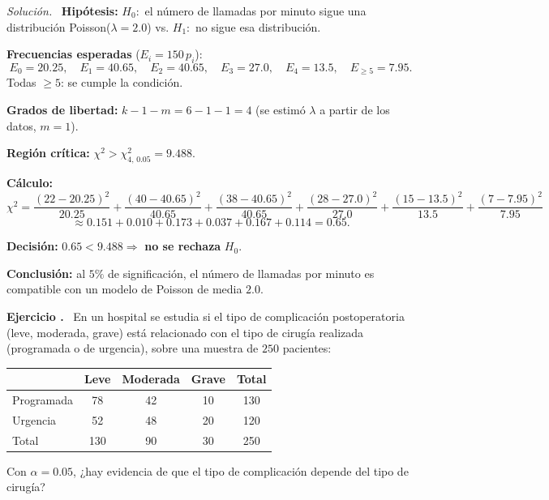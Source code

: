 \documentclass[11pt,a4paper]{article}
\newcounter{ejnum}
\newenvironment{ejercicio}{\refstepcounter{ejnum}\par\medskip\noindent\textbf{Ejercicio \theejnum.}~}{\par}
\newenvironment{solucion}{\par\noindent\textit{Solución.}~}{\par\vspace{1em}}
\begin{document}
\begin{solucion}
\textbf{Hipótesis:} $H_0:$ el número de llamadas por minuto sigue una distribución Poisson($\lambda=2.0$) vs. $H_1:$ no sigue esa distribución.

\textbf{Frecuencias esperadas} ($E_i=150\,p_i$):
\[
E_0=20.25,\quad E_1=40.65,\quad E_2=40.65,\quad E_3=27.0,\quad E_4=13.5,\quad E_{\ge5}=7.95.
\]
Todas $\ge5$: se cumple la condición.

\textbf{Grados de libertad:} $k-1-m=6-1-1=4$ (se estimó $\lambda$ a partir de los datos, $m=1$).

\textbf{Región crítica:} $\chi^2>\chi^2_{4,\,0.05}=9.488$.

\textbf{Cálculo:}
\[
\chi^2=\frac{(22-20.25)^2}{20.25}+\frac{(40-40.65)^2}{40.65}+\frac{(38-40.65)^2}{40.65}+\frac{(28-27.0)^2}{27.0}+\frac{(15-13.5)^2}{13.5}+\frac{(7-7.95)^2}{7.95}
\]
\[
\approx0.151+0.010+0.173+0.037+0.167+0.114=0.65.
\]

\textbf{Decisión:} $0.65<9.488\Rightarrow$ \textbf{no se rechaza} $H_0$.

\textbf{Conclusión:} al $5\%$ de significación, el número de llamadas por minuto es compatible con un modelo de Poisson de media $2.0$.
\end{solucion}

\begin{ejercicio}
En un hospital se estudia si el tipo de complicación postoperatoria (leve, moderada, grave) está relacionado con el tipo de cirugía realizada (programada o de urgencia), sobre una muestra de $250$ pacientes:
\begin{center}
\begin{tabular}{@{}lccc|c@{}}
\toprule
 & Leve & Moderada & Grave & Total \\
\midrule
Programada & 78 & 42 & 10 & 130 \\
Urgencia & 52 & 48 & 20 & 120 \\
\midrule
Total & 130 & 90 & 30 & 250 \\
\bottomrule
\end{tabular}
\end{center}
Con $\alpha=0.05$, ¿hay evidencia de que el tipo de complicación depende del tipo de cirugía?
\end{ejercicio}
\end{document}
